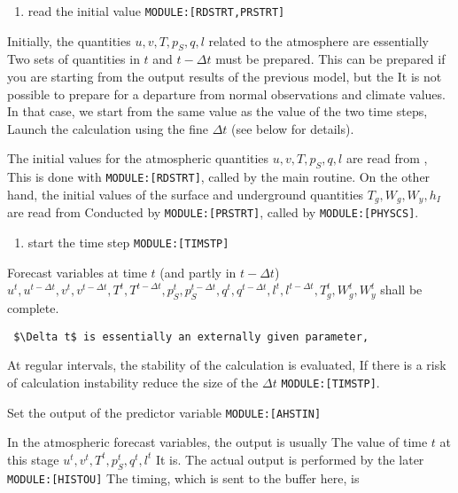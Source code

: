 \begin{enumerate}
\def\labelenumi{\arabic{enumi}.}
\tightlist
\item
  read the initial value \texttt{MODULE:{[}RDSTRT,PRSTRT{]}}
\end{enumerate}

Initially, the quantities \(u, v, T, p_S, q, l\) related to the
atmosphere are essentially Two sets of quantities in \(t\) and
\(t-\Delta t\) must be prepared. This can be prepared if you are
starting from the output results of the previous model, but the It is
not possible to prepare for a departure from normal observations and
climate values. In that case, we start from the same value as the value
of the two time steps, Launch the calculation using the fine
\(\Delta t\) (see below for details).

The initial values for the atmospheric quantities \(u, v, T, p_S, q, l\)
are read from , This is done with \texttt{MODULE:{[}RDSTRT{]}}, called
by the main routine. On the other hand, the initial values of the
surface and underground quantities \(T_g, W_g, W_y, h_I\) are read from
Conducted by \texttt{MODULE:{[}PRSTRT{]}}, called by
\texttt{MODULE:{[}PHYSCS{]}}.

\begin{enumerate}
\def\labelenumi{\arabic{enumi}.}
\setcounter{enumi}{1}
\tightlist
\item
  start the time step \texttt{MODULE:{[}TIMSTP{]}}
\end{enumerate}

Forecast variables at time \(t\) (and partly in \(t-\Delta t\))
\(u^{t}, u^{t-\Delta t}, v^{t}, v^{t-\Delta t}, T^{t}, T^{t-\Delta t}, p_S^{t}, p_S^{t-\Delta t}, q^{t}, q^{t-\Delta t}, l^{t}, l^{t-\Delta t}, T_g^{t}, W_g^{t}, W_y^{t}\)
shall be complete.

\begin{verbatim}
 $\Delta t$ is essentially an externally given parameter,
\end{verbatim}

At regular intervals, the stability of the calculation is evaluated, If
there is a risk of calculation instability reduce the size of the
\(\Delta t\) \texttt{MODULE:{[}TIMSTP{]}}.

Set the output of the predictor variable \texttt{MODULE:{[}AHSTIN{]}}

In the atmospheric forecast variables, the output is usually The value
of time \(t\) at this stage
\(u^{t}, v^{t}, T^{t}, p_S^{t}, q^{t}, l^{t}\) It is. The actual output
is performed by the later \texttt{MODULE:{[}HISTOU{]}} The timing, which
is sent to the buffer here, is

